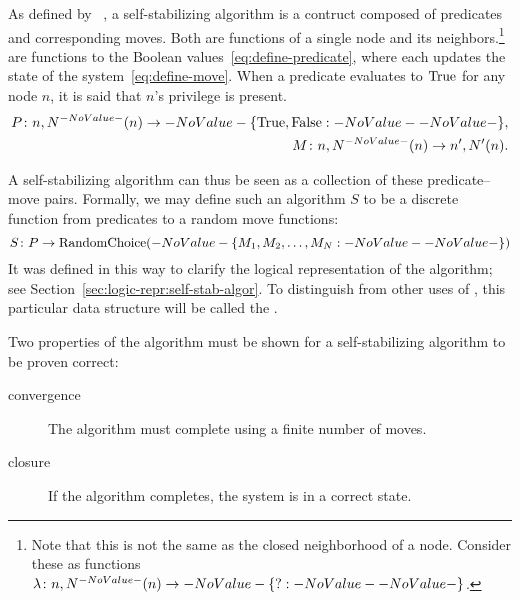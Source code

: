As defined by \citeauthor{dew:sem}~\autocite{dew:sem},
  a self-stabilizing algorithm is a contruct composed of
  predicates and corresponding moves.
Both are functions of a single node and its neighbors.\footnote{%
  Note that this is not the same as the closed neighborhood of a node.
  Consider these as functions $\Function{n, \OpenNeighborhood{n}}{\Set ?}$.}
 are functions to the Boolean values~\eqref{eq:define-predicate},
  where each  updates the state of the system~\eqref{eq:define-move}.
When a predicate evaluates to $\text{True}$ for any node $n$,
  it is said that $n$'s privilege is present.
\begin{align}
  \label{eq:define-predicate}
  \Function[P]{n, \OpenNeighborhood{n}}{\SetBoolean},
  \\
  \label{eq:define-move}
  \Function[M]{n, \OpenNeighborhood{n}}{n^\prime, \OpenNeighborhood[\prime]{n}}.
\end{align}

A self-stabilizing algorithm can thus be seen as
  a collection of these predicate--move pairs.
Formally, we may define such an algorithm $S$ to be a discrete function
  from predicates to a random move functions:
  \begin{equation}
    \label{eq:define-ssalg}
    \Function[S]{P}{\operatorname{RandomChoice}(\Set{M_1, M_2, \dots, M_N})}
  \end{equation}
It was defined in this way to clarify the logical representation of the algorithm;
  see Section~\ref{sec:logic-repr:self-stab-algor}.
To distinguish from other uses of ,
  this particular data structure will be called the .

Two properties of the algorithm must be shown
  for a self-stabilizing algorithm to be proven correct:~\autocite{arora:closure-and-convergence}
\begin{description}
\item[convergence] The algorithm must complete using a finite number of moves.
\item[closure] If the algorithm completes, the system is in a correct state.
\end{description}

